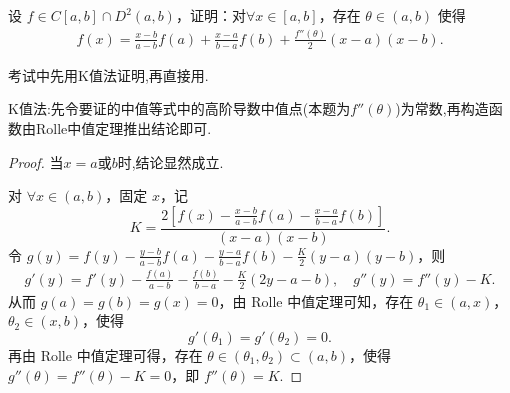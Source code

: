 \documentclass[../../main.tex]{subfiles}
\begin{document}
\begin{proposition}[Lagrange插值公式]\label{proposition:Lagrange插值公式}
设 $f \in C[a, b] \cap D^2(a, b)$，证明：对$\forall x \in [a, b]$，存在 $\theta \in (a, b)$ 使得
\begin{align*}
f(x) = \frac{x - b}{a - b} f(a) + \frac{x - a}{b - a} f(b) + \frac{f''(\theta)}{2} (x - a)(x - b).
\end{align*}
\end{proposition}
\begin{remark}
考试中先用K值法证明,再直接用.
\end{remark}
\begin{note}
K值法:先令要证的中值等式中的高阶导数中值点(本题为$f''(\theta)$)为常数,再构造函数由Rolle中值定理推出结论即可.
\end{note}
\begin{proof}
当$x=a$或$b$时,结论显然成立.

对 $\forall x\in (a,b)$，固定 $x$，记
\[
K=\frac{2\left[ f(x) -\frac{x-b}{a-b}f(a) -\frac{x-a}{b-a}f(b) \right]}{\left( x-a \right) \left( x-b \right)}.
\]
令 $g(y) =f(y) -\frac{y-b}{a-b}f(a) -\frac{y-a}{b-a}f(b) -\frac{K}{2}\left( y-a \right) \left( y-b \right)$，则
\begin{align*}
g'(y) = f'(y) -\frac{f(a)}{a-b}-\frac{f(b)}{b-a}-\frac{K}{2}\left( 2y-a-b \right),\quad 
g''(y) = f''(y) -K.
\end{align*}
从而 $g(a) = g(b) = g(x) = 0$，由 Rolle 中值定理可知，存在 $\theta_1 \in (a,x)$，$\theta_2 \in (x,b)$，使得
\[
g'(\theta_1) = g'(\theta_2) = 0.
\]
再由 Rolle 中值定理可得，存在 $\theta \in (\theta_1, \theta_2) \subset (a,b)$，使得 $g''(\theta) = f''(\theta) - K = 0$，即 $f''(\theta) = K$.

\end{proof}
\end{document}
